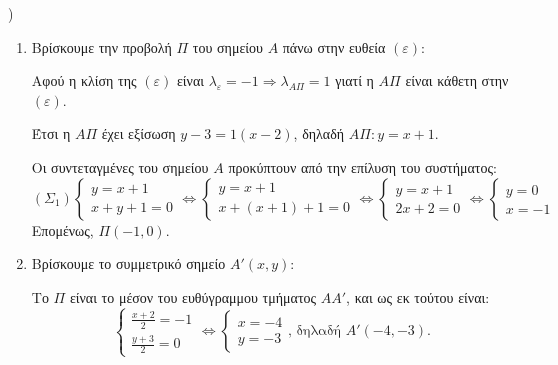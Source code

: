 {\large \alpha)}
\begin{enumerate}
    \item Βρίσκουμε την προβολή $Π$ του σημείου $A$ πάνω στην ευθεία $(\varepsilon)$:

    Αφού η κλίση της $(\varepsilon)$ είναι $\lambda_\varepsilon = -1 \Rightarrow \lambda_{A\Pi} = 1$ γιατί η $A\Pi$ είναι κάθετη στην $(\varepsilon)$.

    Έτσι η $A\Pi$ έχει εξίσωση $y - 3 = 1(x - 2)$, δηλαδή $A\Pi: y = x + 1$.

    Οι συντεταγμένες του σημείου $A$ προκύπτουν από την επίλυση του συστήματος:
    \[
    (\Sigma_1)
    \begin{cases}
    y = x + 1 \\
    x + y + 1 = 0
    \end{cases}
    \Leftrightarrow
    \begin{cases}
    y = x + 1 \\
    x + (x + 1) + 1 = 0
    \end{cases}
    \Leftrightarrow
    \begin{cases}
    y = x + 1 \\
    2x + 2 = 0
    \end{cases}
    \Leftrightarrow
    \begin{cases}
    y = 0 \\
    x = -1
    \end{cases}
    \]
    Επομένως, $Π(-1,0)$.

    \item Βρίσκουμε το συμμετρικό σημείο $A'(x,y)$:

    Το $Π$ είναι το μέσον του ευθύγραμμου τμήματος $AA'$, και ως εκ τούτου είναι:
    \[
    \begin{cases}
    \frac{x+2}{2} = -1 \\
    \frac{y+3}{2} = 0
    \end{cases}
    \Leftrightarrow
    \begin{cases}
    x = -4 \\
    y = -3
    \end{cases}
    \text{, δηλαδή } A'(-4,-3).
    \]
\end{enumerate}

